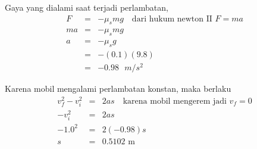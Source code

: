 \begin{solution}
Gaya yang dialami saat terjadi perlambatan,
\begin{eqnarray*}
F&=&-\mu_{s}mg \quad \mbox{dari hukum newton II $F=ma$} \\
ma&=&-\mu_{s}mg \\
a&=&-\mu_{s}g \\
&=&-(0.1)(9.8) \\
&=&-0.98 \textrm{ $m/s^2$}
\end{eqnarray*}

Karena mobil mengalami perlambatan konstan, maka berlaku
\begin{eqnarray*}
v_{f}^{2}-v_{i}^{2}&=&2as  \quad \mbox{karena mobil mengerem jadi $v_{f}=0$} \\
-v_{i}^{2}&=&2as \\
-1.0^2&=&2(-0.98)s \\
s&=&0.5102 \textrm{ m}
\end{eqnarray*}
\end{solution}
